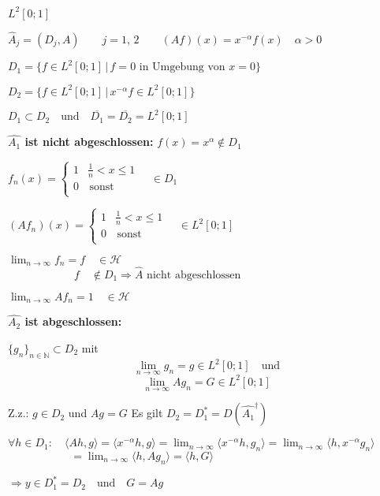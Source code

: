 \begin{Bsp}
    $L^2[0;1]$

    $\hat{A}_j = (D_j,A) \quad\quad j=1, \,2 \quad\quad (Af)(x) = x^{-\alpha} f(x) \quad \alpha >0 $

    $D_1 = \{ f \in L^2[0;1] \,|\, f = 0 \textrm{ in Umgebung von } x=0 \}$
    
    $D_2 = \{ f \in L^2[0;1] \,|\, x^{- \alpha} f \in L^2[0;1] \}$

    $D_1 \subset D_2 \quad \textrm{und} \quad \overline{D_1} = \overline{D_2} = L^2[0;1]$

    \textbf{$\hat{A_1}$ ist nicht abgeschlossen:} $f(x) = x^\alpha \notin D_1$
    \begin{addmargin}[25pt]{0pt}
        $f_n(x) = \left\{ \begin{array}{ll}
            1 & \frac{1}{n} < x \leq 1  \\
            0 & \, \textrm{sonst} \\
            \end{array}
            \right. \quad \in D_1$

        $(Af_n)(x) = \left\{ \begin{array}{ll}
            1 & \frac{1}{n} < x \leq 1  \\
            0 & \, \textrm{sonst} \\
            \end{array}
            \right. \quad \in L^2[0;1]$         
            
        $\lim_{n \rightarrow \infty} f_n = f \quad \in \mathcal{H}$\\
        $\textrm{  } \hspace{5em} \,\, f \quad \notin D_1 \Rightarrow \hat{A} \textrm{ nicht abgeschlossen}$

        $\lim_{n \rightarrow \infty} Af_n = 1 \quad \in \mathcal{H}$
    \end{addmargin}


    \textbf{$\hat{A_2}$ ist abgeschlossen:}
    \begin{addmargin}[25pt]{0pt}
        $\{g_n\}_{n \in \mathbb{N}} \subset D_2$ mit
        $$ \lim_{n \rightarrow \infty} g_n = g \in L^2[0;1] \quad \textrm{und}$$
        $$ \lim_{n \rightarrow \infty} Ag_n = G \in L^2[0;1]$$
        
        Z.z.: $g \in D_2$ und $Ag=G$ Es gilt $D_2 = D_1^\ast = D(\hat{A_1}^ \dagger)$

        $\forall h \in D_1: \quad \langle Ah, g \rangle = \langle x^{-\alpha} h, g \rangle =
        \lim_{n \rightarrow \infty} \langle x^{-\alpha} h, g_n \rangle =
        \lim_{n \rightarrow \infty} \langle h, x^{-\alpha} g_n \rangle$\\ 
        $\textrm{ } \qquad \qquad \quad = \lim_{n \rightarrow \infty} \langle h, A g_n \rangle =
        \langle h , G \rangle$

        $\Rightarrow y \in D_1^\ast = D_2 \quad \textrm{und} \quad G = Ag$
    \end{addmargin}
\end{Bsp}

